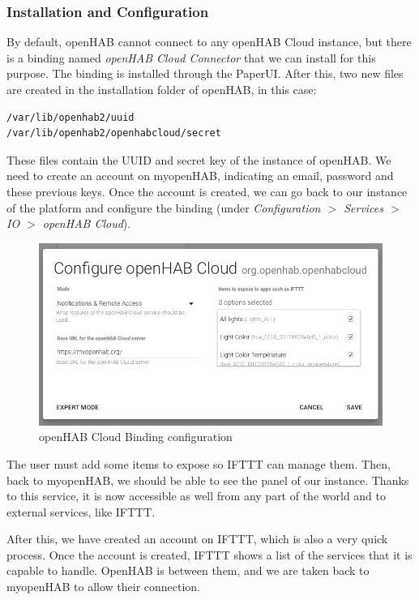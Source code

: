 \subsubsection{Installation and Configuration}
By default, openHAB cannot connect to any openHAB Cloud instance, but there is a binding named \textit{openHAB Cloud Connector}
that we can install for this purpose. The binding is installed through the PaperUI. After this, two new files are created in the installation
folder of openHAB, in this case:

\begin{lstlisting}[style=Consola]
/var/lib/openhab2/uuid
/var/lib/openhab2/openhabcloud/secret
\end{lstlisting}

These files contain the UUID and secret key of the instance of openHAB. We need to create an account on myopenHAB, indicating an
email, password and these previous keys. Once the account is created, we can go back to our instance of the platform and configure
the binding (under \textit{Configuration $>$ Services $>$ IO $>$ openHAB Cloud}).

\begin{figure}
	\centering
	\includegraphics[width=1\textwidth]{images/Chapter_07/openhab-cloud-binding-conf.png}
	\caption{openHAB Cloud Binding configuration}
	\label{fig:openhab-cloud-binding-conf}
\end{figure}

The user must add some items to expose so IFTTT can manage them. Then, back to myopenHAB, we should be able to see the panel
of our instance. Thanks to this service, it is now accessible as well from any part of the world and to external services, like IFTTT.

After this, we have created an account on IFTTT, which is also a very quick process. Once the account is created, IFTTT shows a list
of the services that it is capable to handle. OpenHAB is between them, and we are taken back to myopenHAB to allow their connection.

